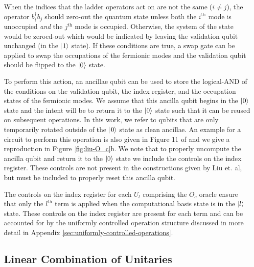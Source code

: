 When the indices that the ladder operators act on are not the same ($i \neq j$), the operator $b_i^\dagger b_j$ should zero-out the quantum state unless both the $i^\text{th}$ mode is unoccupied \textit{and} the $j^\text{th}$ mode is occupied.
Otherwise, the system of the state would be zeroed-out which would be indicated by leaving the validation qubit unchanged (in the $\ket{1}$ state).
If these conditions are true, a swap gate can be applied to swap the occupations of the fermionic modes and the validation qubit should be flipped to the $\ket{0}$ state. 

To perform this action, an ancillae qubit can be used to store the logical-AND of the conditions on the validation qubit, the index register, and the occupation states of the fermionic modes.
We assume that this ancilla qubit begins in the $\ket{0}$ state and the intent will be to return it to the $\ket{0}$ state such that it can be reused on subsequent operations.
In this work, we refer to qubits that are only temporarily rotated outside of the $\ket{0}$ state as clean ancillae.
An example for a circuit to perform this operation is also given in Figure 11 of \cite{liu2024efficient} and we give a reproduction in Figure \ref{fig:liu-O_c}b.
We note that to properly uncompute the ancilla qubit and return it to the $\ket{0}$ state we include the controls on the index register.
These controls are not present in the constructions given by Liu et. al, but must be included to properly reset this ancilla qubit.

The controls on the index register for each $U_l$ comprising the $O_c$ oracle ensure that only the $l^\text{th}$ term is applied when the computational basis state is in the $\ket{l}$ state.
These controls on the index register are present for each term and can be accounted for by the uniformly controlled operation structure discussed in more detail in Appendix \ref{sec:uniformly-controlled-operations}.

\subsection{Linear Combination of Unitaries}
\label{subsec:lcu}

